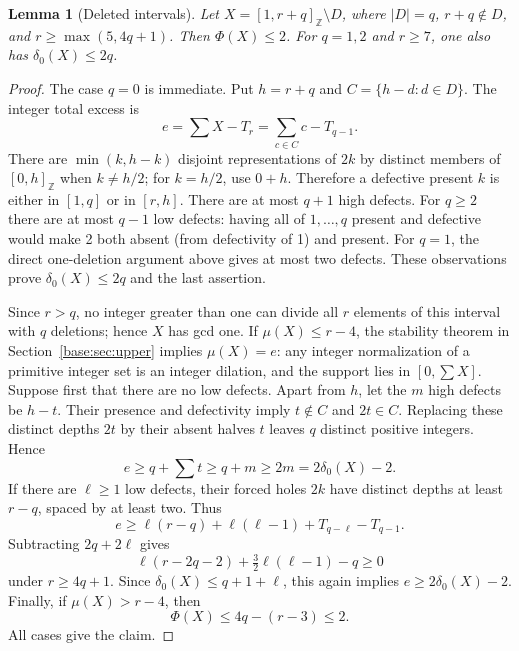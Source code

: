 \documentclass[11pt,a4paper]{article}
\newtheorem{lemma}[theorem]{Lemma}
\theoremstyle{remark}
\begin{document}
\begin{lemma}[Deleted intervals]\label{u96:lem:deleted}
Let $X=[1,r+q]_{\mathbb Z}\setminus D$, where $|D|=q$, $r+q\notin D$,
and $r\geq\max(5,4q+1)$. Then $\Phi(X)\leq2$.
For $q=1,2$ and $r\geq7$, one also has $\delta_0(X)\leq2q$.
\end{lemma}
\begin{proof}
The case $q=0$ is immediate. Put $h=r+q$ and
$C=\{h-d:d\in D\}$. The integer total excess is
\[
e=\sum X-T_r=\sum_{c\in C}c-T_{q-1}.
\]
There are $\min(k,h-k)$ disjoint representations of $2k$ by distinct
members of $[0,h]_{\mathbb Z}$ when $k\ne h/2$; for $k=h/2$, use $0+h$.
Therefore a defective present $k$ is either in $[1,q]$ or in $[r,h]$.
There are at most $q+1$ high defects. For $q\geq2$ there are at most $q-1$
low defects: having all of $1,\ldots,q$ present and defective would make
2 both absent (from defectivity of 1) and present. For $q=1$, the direct
one-deletion argument above gives at most two defects. These observations
prove $\delta_0(X)\leq2q$ and the last assertion.

Since $r>q$, no integer greater than one can divide all $r$ elements
of this interval with $q$ deletions; hence $X$ has gcd one.
If $\mu(X)\leq r-4$, the stability theorem in Section~\ref{base:sec:upper}
implies $\mu(X)=e$: any integer normalization of a primitive integer set
is an integer dilation, and the support lies in $[0,\sum X]$.
Suppose first that there are no low defects. Apart from $h$, let the $m$
high defects be $h-t$. Their presence and defectivity imply
$t\notin C$ and $2t\in C$. Replacing these distinct depths $2t$ by their
absent halves $t$ leaves $q$ distinct positive integers. Hence
\[
e\geq q+\sum t\geq q+m\geq2m=2\delta_0(X)-2.
\]
If there are $\ell\geq1$ low defects, their forced holes $2k$ have distinct
depths at least $r-q$, spaced by at least two. Thus
\[
e\geq\ell(r-q)+\ell(\ell-1)+T_{q-\ell}-T_{q-1}.
\]
Subtracting $2q+2\ell$ gives
\[
\ell(r-2q-2)+\tfrac32\ell(\ell-1)-q\geq0
\]
under $r\geq4q+1$. Since $\delta_0(X)\leq q+1+\ell$, this again implies
$e\geq2\delta_0(X)-2$.
Finally, if $\mu(X)>r-4$, then
\[
\Phi(X)\leq4q-(r-3)\leq2.
\]
All cases give the claim.
\end{proof}
\end{document}
